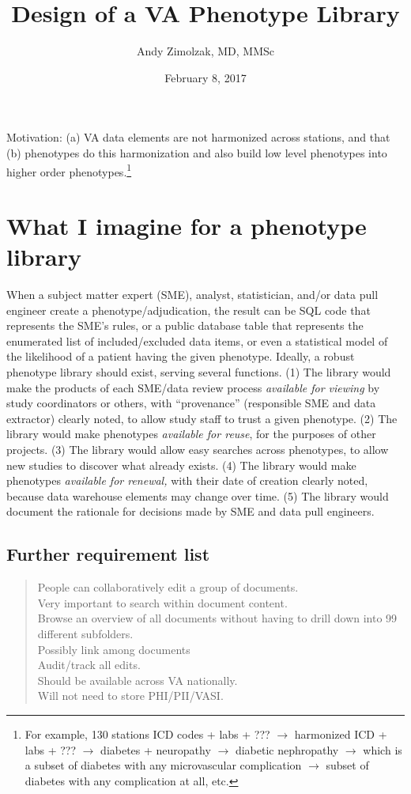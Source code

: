\documentclass{tufte-handout}
\title{Design of a VA Phenotype Library}
\author{Andy Zimolzak, MD, MMSc}
\date{February 8, 2017}
\begin{document}
\maketitle

Motivation: (a) VA data elements are not harmonized across stations,
and that (b) phenotypes do this harmonization and also build low level
phenotypes into higher order phenotypes.\footnote{For example, 130
  stations ICD codes + labs + ??? $\to$ harmonized ICD + labs + ???
  $\to$ diabetes + neuropathy $\to$ diabetic nephropathy $\to$ which
  is a subset of diabetes with any microvascular complication $\to$
  subset of diabetes with any complication at all, etc.}

\section{What I imagine for a phenotype library}

When a subject matter expert (SME), analyst, statistician, and/or data
pull engineer create a phenotype/adjudication, the result can be SQL
code that represents the SME's rules, or a public database table that
represents the enumerated list of included/excluded data items, or
even a statistical model of the likelihood of a patient having the
given phenotype. Ideally, a robust phenotype library should exist,
serving several functions. (1) The library would make the products of
each SME/data review process \emph{available for viewing} by study
coordinators or others, with ``provenance'' (responsible SME and data
extractor) clearly noted, to allow study staff to trust a given
phenotype. (2) The library would make phenotypes \emph{available for
  reuse}, for the purposes of other projects. (3) The library would
allow easy searches across phenotypes, to allow new studies to
discover what already exists. (4) The library would make phenotypes
\emph{available for renewal,} with their date of creation clearly
noted, because data warehouse elements may change over time. (5) The
library would document the rationale for decisions made by SME and
data pull engineers.

\subsection{Further requirement list}

\begin{quote}
People can collaboratively edit a group of documents.\\
Very important to search within document content.\\
Browse an overview of all documents without having to drill down into 99 different subfolders.\\
Possibly link among documents\\
Audit/track all edits.\\
Should be available across VA nationally.\\
Will not need to store PHI/PII/VASI. \\
\end{quote}
\end{document}
